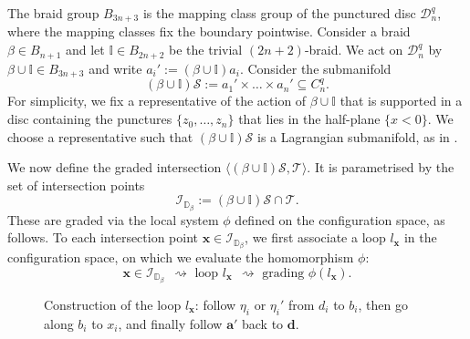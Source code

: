\documentclass[11pt]{amsart}
\numberwithin{equation}{section}
\numberwithin{figure}{section}
\theoremstyle{definition}
\newcommand{\cD}{\mathcal{D}}
\newcommand{\cI}{\mathcal{I}}
\newcommand{\cs}{\mathscr{S}}
\newcommand{\ct}{\mathscr{T}}
\newcommand{\bD}{\mathbb{D}}
\newcommand{\bI}{\mathbb{I}}
\newcommand{\ds}{\boldsymbol{d}}
\newcommand{\ba}{\boldsymbol{a}}
\newcommand{\xs}{\boldsymbol{x}}
\begin{document}
The braid group $B_{3n+3}$ is the mapping class group of the punctured disc $\cD_n^q$, where the mapping classes fix the boundary pointwise. Consider a braid $\beta \in B_{n+1}$ and let $\mathbb I \in B_{2n+2}$ be the trivial $(2n+2)$-braid. We act on $\cD_n^q$ by $\beta \cup \mathbb I \in B_{3n+3}$ and write $a_i' := (\beta \cup \mathbb I) a_i$. Consider the submanifold
\[
(\beta \cup \mathbb I) \cs := a_1' \times \dots \times a_n' \subseteq C^q_n.
\]
For simplicity, we fix a representative of the action of $\beta \cup \bI$ that is supported in a disc containing the punctures $\{z_0,\dots,z_n\}$ that lies in the half-plane $\{x<0\}$. We choose a representative such that $(\beta \cup \mathbb I) \cs$ is a Lagrangian submanifold, as in \cite[Section~2.2]{Anghel2023TAMS}.

We now define the graded intersection $\langle (\beta\cup \bI) \cs,\ct \rangle$. It is parametrised by the set of intersection points 
\begin{equation}
\cI_{\bD_\beta}:=(\beta \cup \mathbb I) \cs\cap \ct.
\end{equation}
These are graded via the local system $\phi$ defined on the configuration space, as follows. To each intersection point $\xs \in \cI_{\bD_\beta}$, we first associate a loop $l_{\xs}$ in the configuration space, on which we evaluate the homomorphism $\phi$:
\[
\xs \in \cI_{\bD_\beta} \ \ \rightsquigarrow \text{ loop } l_{\xs} \ \ \rightsquigarrow \text{ grading }  \phi(l_{\xs}).
\]

\begin{figure}
\centering
\def\svgwidth{0.5\textwidth}

\caption{Construction of the loop $l_{\xs}$: follow $\eta_i$ or $\eta_i'$ from $d_i$ to $b_i$, then go along $b_i$ to $x_i$, and finally follow $\ba'$ back to $\ds$.}\label{fig:l_x}
\end{figure}
\end{document}
